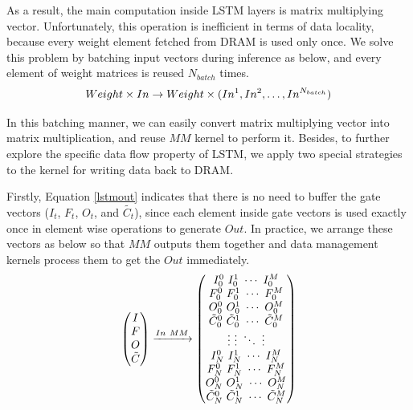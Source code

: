 \documentclass{acm_proc_article-sp-copy}
\begin{document}
\vspace{-10pt}As a result, the main computation inside LSTM layers is matrix multiplying vector. Unfortunately, this operation is inefficient
in terms of data locality, because every weight element fetched from DRAM is used only once. We solve this problem by batching input vectors during inference as below, and every element of weight matrices is reused $N_{batch}$ times.
\vspace{-6pt}
\begin{equation}
\centering
Weight \times In \rightarrow Weight \times (In^1, In^2, \dots, In^{N_{batch}})
\end{equation}

\vspace{-10pt}In this batching manner, we can easily convert matrix multiplying vector into matrix multiplication, and reuse $MM$ kernel to perform it. Besides, to further explore the specific data flow property of LSTM, we apply two special strategies to the kernel for writing data back to DRAM.

Firstly, Equation \ref{lstmout} indicates that there is no need to buffer the gate vectors ($I_t$, $F_t$, $O_t$, and $\tilde{C_t}$), since each element inside gate vectors is used exactly once in element wise operations to generate $Out$. In practice, we arrange these vectors as below so that $MM$ outputs them together and data management kernels process them to get the $Out$ immediately.
\vspace{-10pt}
\begin{equation}
\centering
\begin{pmatrix}
I\\
F\\
O\\
\tilde{C}\\
\end{pmatrix}
\xrightarrow{In\ MM}
\begin{pmatrix}
I^0_0\ I^1_0\ \cdots\ I^M_0\\
F^0_0\ F^1_0\ \cdots\ F^M_0\\
O^0_0\ O^1_0\ \cdots\ O^M_0\\
\tilde{C}^0_0\ \tilde{C}^1_0\ \cdots\ \tilde{C}^M_0\\
\vdots\ \vdots\ \ddots\ \vdots\\
I^0_N\ I^1_N\ \cdots\ I^M_N\\
F^0_N\ F^1_N\ \cdots\ F^M_N\\
O^0_N\ O^1_N\ \cdots\ O^M_N\\
\tilde{C}^0_N\ \tilde{C}^1_N\ \cdots\ \tilde{C}^M_N\\
\end{pmatrix}
\label{lstmlayout}
\end{equation}
\end{document}
